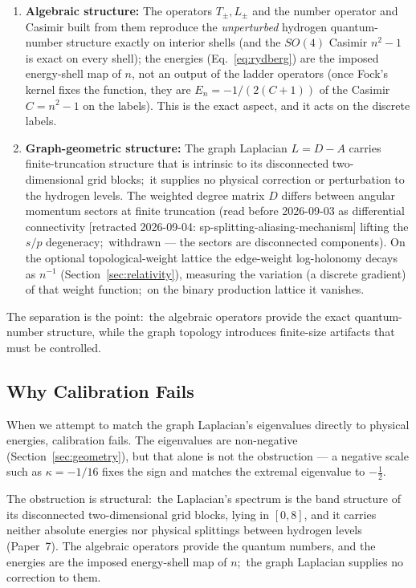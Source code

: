 \documentclass[aps,pra,twocolumn,superscriptaddress,longbibliography]{revtex4-2}
\newcommand{\gvc}[2]{#2}
\begin{document}
\begin{enumerate}
\item \textbf{Algebraic structure:} The operators $T_\pm, L_\pm$ and the number operator and Casimir built from them reproduce the \textit{unperturbed} hydrogen quantum-number structure exactly on interior shells (and the $SO(4)$ Casimir $n^2-1$ is exact on every shell); the energies (Eq.~\ref{eq:rydberg}) are the imposed energy-shell map of $n$, not an output of the ladder operators (once Fock's kernel fixes the function, they are $E_n = -1/(2(C+1))$ of the Casimir $C = n^2-1$ on the labels). This is the exact aspect, and it acts on the discrete labels.

\item \textbf{Graph-geometric structure:} The graph Laplacian $L = D - A$ carries finite-truncation structure that is intrinsic to its disconnected two-dimensional grid blocks;\ it supplies no physical correction or perturbation to the hydrogen levels. The weighted degree matrix $D$ differs between angular momentum sectors at finite truncation (read before 2026-09-03 as differential connectivity [retracted 2026-09-04: sp-splitting-aliasing-mechanism] lifting the $s/p$ degeneracy;\ withdrawn --- the sectors are disconnected components). On the optional topological-weight lattice the edge-weight log-holonomy decays as $n^{-1}$ (Section~\ref{sec:relativity}), measuring the variation (a discrete gradient) of that weight function;\ on the binary production lattice it vanishes.
\end{enumerate}

The separation is the point:\ the algebraic operators provide the exact quantum-number structure, while the graph topology introduces finite-size artifacts that must be controlled.

\subsection{Why Calibration Fails}

When we attempt to match the graph Laplacian's eigenvalues directly to physical energies, calibration fails. The eigenvalues are non-negative (Section~\ref{sec:geometry}), but that alone is not the obstruction --- a negative scale such as $\kappa = -1/16$ fixes the sign and matches the extremal eigenvalue to $-\tfrac12$.

\gvc{graph-s3-wall}{The obstruction is structural:\ the Laplacian's spectrum is the band structure of its disconnected two-dimensional grid blocks, lying in $[0, 8]$, and it carries neither absolute energies nor physical splittings between hydrogen levels (Paper~7)}.  The algebraic operators provide the quantum numbers, and the energies are the imposed energy-shell map of $n$;\ the graph Laplacian supplies no correction to them.
\end{document}
